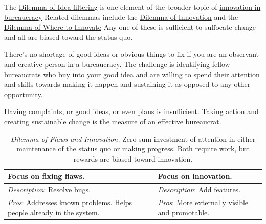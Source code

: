 The \hyperref[table:dilemma-personal-idea-filtering]{Dilemma of Idea filtering} 
\iftoggle{printedonpaper}{ (\ref{table:dilemma-personal-idea-filtering})}{} is 
one element of the broader topic of \hyperref[sec:innovation]{innovation in bureaucracy}
\iftoggle{printedonpaper}{ (see page~\pageref{sec:innovation}).}{.} Related dilemmas include 
the \hyperref[table:dilemma-personal-disruptive-or-iterative]{Dilemma of Innovation} 
\iftoggle{printedonpaper}{ (\ref{table:dilemma-personal-disruptive-or-iterative})}{} and 
the \hyperref[table:dilemma-personal-where-to-innovate]{Dilemma of Where to Innovate}
\iftoggle{printedonpaper}{ (\ref{table:dilemma-personal-where-to-innovate}).}{.} Any 
one of these is sufficient to suffocate change and all are biased toward the status quo.  

There's no shortage of good ideas or obvious things to fix if you are an observant and creative person in a bureaucracy.
The challenge is identifying fellow bureaucrats who buy into your good idea and are willing to spend their attention and skills towards making it happen and sustaining it as opposed to any other opportunity.

Having complaints, or good ideas, or even plans is insufficient. Taking action and creating sustainable change is the measure of an effective bureaucrat.



\begin{center}
\begin{table}[H] %
\begin{tabular}{ | m{\dilemmatablewidth}| m{\dilemmatablewidth} | } 
  \hline
  \textbf{Focus on fixing flaws.} &
  \textbf{Focus on innovation.} \\
  \hline
  \textit{Description}: Resolve bugs. &
  \textit{Description}: Add features. \\
  \hline
  \textit{Pros}: Addresses known problems. Helps people already in the system.  & 
  \textit{Pros}: More externally visible and promotable. \\
  \hline
\end{tabular}
\caption{
\textit{Dilemma of Flaws and Innovation.}
Zero-sum investment of attention in either maintenance of the status quo or making progress. Both require work, but rewards are biased toward innovation. 
}
\label{table:dilemma-personal-flaws-and-innovation}
\end{table}
\end{center}

